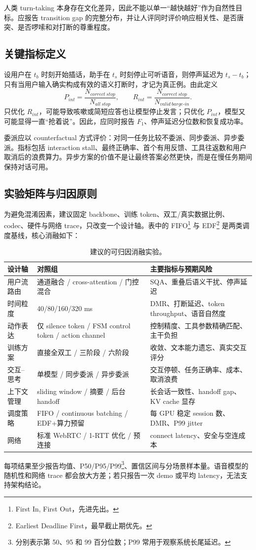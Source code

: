 人类 turn-taking 本身存在文化差异\cite{stivers2009turntaking}，因此不能以单一“越快越好”作为自然性目标。应报告 transition gap 的完整分布，并让人评同时评价响应相关性、是否唐突、是否啰嗦和对打断的尊重程度。

\subsection{关键指标定义}

设用户在 $t_b$ 时刻开始插话，助手在 $t_s$ 时刻停止可听语音，则停声延迟为 $t_s-t_b$；只有当用户输入确实构成有效的语义打断时，才记为真正例。由此定义
\begin{equation}
P_{int}=\frac{N_{correct\ stop}}{N_{all\ stop}},\qquad
R_{int}=\frac{N_{correct\ stop}}{N_{valid\ barge\mbox{-}in}}.
\end{equation}
只优化 $R_{int}$，可能导致咳嗽或简短应答也让模型停止发言；只优化 $P_{int}$，模型又可能显得一直“抢着说”。因此，应同时报告 $F_1$、停声延迟分位数和恢复成功率。

委派应以 counterfactual 方式评价：对同一任务比较不委派、同步委派、异步委派。指标包括 interaction stall、最终正确率、首个有用反馈、工具往返数和用户取消后的浪费算力。异步方案的价值不是让最终答案必然更快，而是在慢任务期间保持对话可用。

\subsection{实验矩阵与归因原则}

为避免混淆因素，建议固定 backbone、训练 token、双工/真实数据比例、codec、硬件与网络 trace，只改变一个设计轴。表中的 FIFO\footnote{First In, First Out，先进先出。} 与 EDF\footnote{Earliest Deadline First，最早截止期优先。} 是两类调度基线，核心消融如下：

\begin{table}[H]
\centering\small
\caption{建议的可归因消融实验。}
\begin{tabularx}{\textwidth}{p{3.0cm}p{4.0cm}X}
\toprule
设计轴 & 对照组 & 主要指标与预期风险 \\
\midrule
用户流路由 & 通道融合 / cross-attention / 门控混合 & SQA、重叠后语义干扰、停声延迟 \\
时间粒度 & 40/80/160/320 ms & DMR、打断延迟、token throughput、语音自然度 \\
动作表达 & 仅 silence token / FSM control token / action channel & 控制精度、工具参数精确匹配、主干负担 \\
训练方案 & 直接全双工 / 三阶段 / 六阶段 & 收敛、文本能力遗忘、真实交互评分 \\
交互--思考 & 单模型 / 同步委派 / 异步委派 & 交互停顿、任务正确率、成本、取消浪费 \\
上下文管理 & sliding window / 摘要 / 后台 handoff & 长会话一致性、handoff gap、KV cache 显存 \\
调度策略 & FIFO / continuous batching / EDF+算力预留 & 每 GPU 稳定 session 数、DMR、P99 jitter \\
网络 & 标准 WebRTC / 1-RTT 优化 / 预连接 & connect latency、安全与空连成本 \\
\bottomrule
\end{tabularx}
\end{table}

每项结果至少报告均值、P50/P95/P99\footnote{分别表示第 50、95 和 99 百分位数；P99 常用于观察系统长尾延迟。}、置信区间与分场景样本量。语音模型的随机性和网络 trace 都会放大方差；若只报告一次 demo 或平均 latency，无法支持架构结论。
